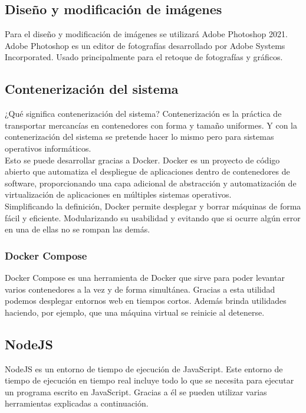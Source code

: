 \subsection{Diseño y modificación de imágenes}

Para el diseño y modificación de imágenes se utilizará Adobe Photoshop 2021. Adobe Photoshop es un editor de fotografías desarrollado por Adobe Systems Incorporated. Usado principalmente para el retoque de fotografías y gráficos.

\subsection{Contenerización del sistema}

¿Qué significa contenerización del sistema? Contenerización es la práctica de transportar mercancías en contenedores con forma y tamaño uniformes. Y con la contenerización del sistema se pretende hacer lo mismo pero para sistemas operativos informáticos.
\\Esto se puede desarrollar gracias a Docker. Docker es un proyecto de código abierto que automatiza el despliegue de aplicaciones dentro de contenedores de software, proporcionando una capa adicional de abstracción y automatización de virtualización de aplicaciones en múltiples sistemas operativos.
\\Simplificando la definición, Docker permite desplegar y borrar máquinas de forma fácil y eficiente. Modularizando su usabilidad y evitando que si ocurre algún error en una de ellas no se rompan las demás.

\subsubsection{Docker Compose}

Docker Compose es una herramienta de Docker que sirve para poder levantar varios contenedores a la vez y de forma simultánea. Gracias a esta utilidad podemos desplegar entornos web en tiempos cortos. Además brinda utilidades haciendo, por ejemplo, que una máquina virtual se reinicie al detenerse.

\subsection{NodeJS}

NodeJS es un entorno de tiempo de ejecución de JavaScript. Este entorno de tiempo de ejecución en tiempo real incluye todo lo que se necesita para ejecutar un programa escrito en JavaScript. Gracias a él se pueden utilizar varias herramientas explicadas a continuación.

